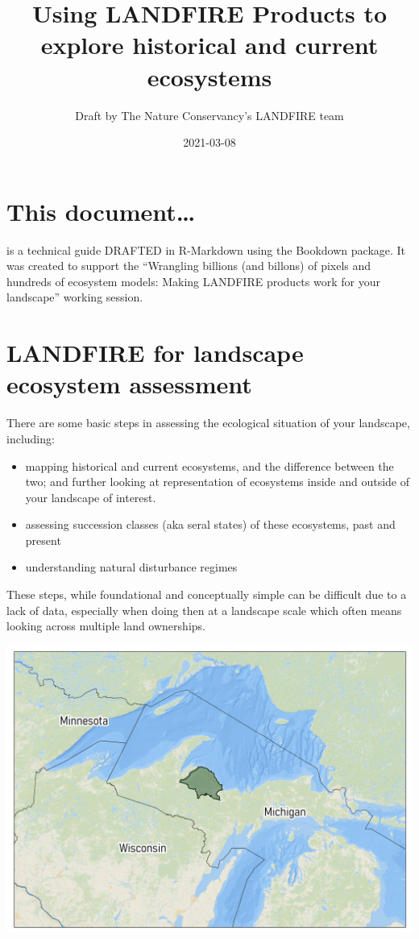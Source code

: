 \documentclass[
]{book}
\title{Using LANDFIRE Products to explore historical and current ecosystems}
\author{Draft by The Nature Conservancy's LANDFIRE team}
\date{2021-03-08}
\providecommand{\tightlist}{%
  \setlength{\itemsep}{0pt}\setlength{\parskip}{0pt}}
\begin{document}
\maketitle

{
\setcounter{tocdepth}{1}
\tableofcontents
}
\hypertarget{this-document}{%
\chapter{This document\ldots{}}\label{this-document}}

is a technical guide DRAFTED in R-Markdown using the Bookdown package. It was created to support the ``Wrangling billions (and billons) of pixels and hundreds of ecosystem models: Making LANDFIRE products work for your landscape'' working session.

\hypertarget{landfire-for-landscape-ecosystem-assessment}{%
\chapter{LANDFIRE for landscape ecosystem assessment}\label{landfire-for-landscape-ecosystem-assessment}}

There are some basic steps in assessing the ecological situation of your landscape, including:

\begin{itemize}
\tightlist
\item
  mapping historical and current ecosystems, and the difference between the two; and further looking at representation of ecosystems inside and outside of your landscape of interest.
\item
  assessing succession classes (aka seral states) of these ecosystems, past and present
\item
  understanding natural disturbance regimes
\end{itemize}

These steps, while foundational and conceptually simple can be difficult due to a lack of data, especially when doing then at a landscape scale which often means looking across multiple land ownerships.

\includegraphics[width=0.5\linewidth,style="float:right; padding:10px"]{michi}
\end{document}
